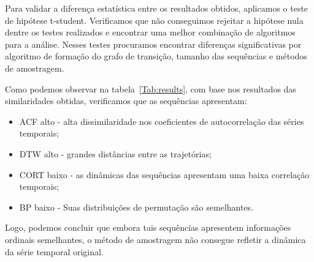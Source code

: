 \documentclass[10pt]{article}
\begin{document}
Para validar a diferença estatística entre os resultados obtidos, aplicamos o teste de hipótese t-student. 
Verificamos que não conseguimos rejeitar a hipótese nula dentre os testes realizados e encontrar uma melhor combinação de algoritmos para a análise.
Nesses testes procuramos encontrar diferenças significativas por algoritmo de formação do grafo de transição, tamanho das sequências e métodos de amostragem.

Como podemos observar na tabela~\ref{Tab:results}, com base nos resultados das similaridades obtidas, verificamos que as sequências apresentam:
\begin{itemize}
    \item ACF alto - alta dissimilaridade nos coeficientes de autocorrelação das séries temporais;
    \item DTW alto - grandes distâncias entre as trajetórias;
    \item CORT baixo - as dinâmicas das sequências apresentam uma baixa correlação temporais;
    \item BP baixo - Suas distribuições de permutação são semelhantes.
\end{itemize}
Logo, podemos concluir que embora tais sequências apresentem informações ordinais semelhantes, o método de amostragem não consegue refletir a dinâmica da série temporal original.
\end{document}
